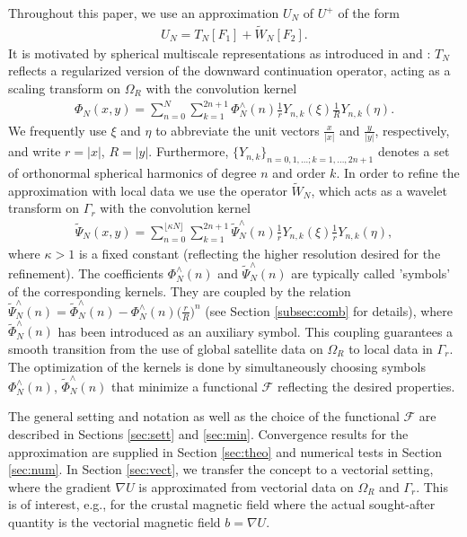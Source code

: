 \documentclass[a4paper, 10pt]{article}
\numberwithin{equation}{section}
\theoremstyle{definition}
\begin{document}
Throughout this paper, we use an approximation $U_N$ of $U^+$ of the form 
\begin{align}\label{eqn:firstapprox}
{U_N={T}_N[F_1]+{\tilde{W}}_N[F_2].}
\end{align}
It is motivated by spherical multiscale representations as introduced in \cite{schneider98} and \cite{freewind}: $T_N$ reflects a regularized version of the downward continuation operator, acting as a scaling transform on $\Omega_R$ with the convolution kernel 
\begin{align}\label{eqn:phin}
{\Phi_N(x,y)=\sum_{n=0}^N\sum_{k=1}^{2n+1}\Phi_N^\wedge(n)\frac{1}{r}Y_{n,k}\left(\xi\right)\frac{1}{R}Y_{n,k}\left(\eta\right).}
\end{align}
We frequently use $\xi$ and $\eta$ to abbreviate the unit vectors $\frac{x}{|x|}$ and $\frac{y}{|y|}$, respectively, and write $r=|x|$, $R=|y|$. Furthermore, $\{Y_{n,k}\}_{n=0,1,\ldots;k=1,\ldots,2n+1}$ denotes a set of orthonormal spherical harmonics of degree $n$ and order $k$. In order to refine the approximation with local data we use the operator $\tilde{W}_N$, which acts as a wavelet transform on $\Gamma_r$ with the convolution kernel
\begin{align}\label{eqn:psin}
{\tilde{\Psi}_N(x,y)=\sum_{n=0}^{\lfloor\kappa N\rfloor}\sum_{k=1}^{2n+1}\tilde{\Psi}_N^\wedge(n)\frac{1}{r}Y_{n,k}\left(\xi\right)\frac{1}{r}Y_{n,k}\left(\eta\right), }
\end{align}
where $\kappa>1$ is a fixed constant (reflecting the higher resolution desired for the refinement). The coefficients ${\Phi}_N^\wedge(n)$ and $\tilde{\Psi}_N^\wedge(n)$ are typically called 'symbols' of the corresponding kernels. They are coupled by the relation $\tilde{\Psi}_N^\wedge(n)=\tilde{\Phi}_N^\wedge(n)-{\Phi}_N^\wedge(n)\big(\frac{r}{R}\big)^n$ (see Section \ref{subsec:comb} for details), where $\tilde{\Phi}_N^\wedge(n)$ has been introduced as an auxiliary symbol. This coupling guarantees a smooth transition from the use of global satellite data on $\Omega_R$ to local data in $\Gamma_r$. The optimization of the kernels is done by simultaneously choosing symbols $\Phi_N^\wedge(n)$, $\tilde{\Phi}_N^\wedge(n)$ that minimize a functional $\mathcal{F}$ reflecting the desired properties. 

The general setting and notation as well as the choice of the functional $\mathcal{F}$ are described in Sections \ref{sec:sett} and \ref{sec:min}. Convergence results for the approximation are supplied in Section \ref{sec:theo} and numerical tests in Section \ref{sec:num}. In Section \ref{sec:vect}, we transfer the concept to a vectorial setting, where the gradient $\nabla U$ is approximated from vectorial data on $\Omega_R$ and $\Gamma_r$. This is of interest, e.g., for the crustal magnetic field where the actual sought-after quantity is the vectorial magnetic field $b=\nabla U$. 
\end{document}
